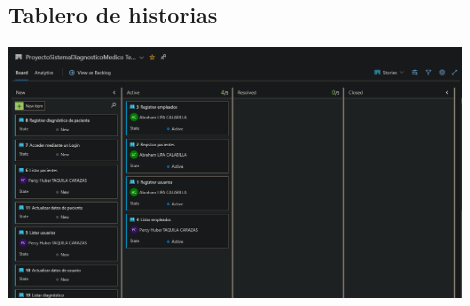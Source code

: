 \documentclass[preprint,12pt,notitlepage]{elsarticle}
\begin{document}
	\subsection{Tablero de historias}


	\includegraphics[width=12cm]{./imagen/Screenshot_2020-10-31 ProyectoSistemaDiagnosticoMedico Team Stories Board - Boards.png}
\end{document}
